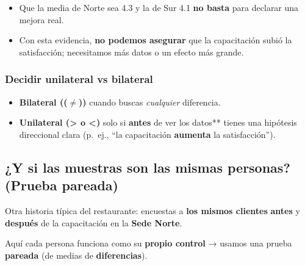 \documentclass[
  spanish,
  letterpaper,
  DIV=11,
  numbers=noendperiod]{scrreprt}
\providecommand{\tightlist}{%
  \setlength{\itemsep}{0pt}\setlength{\parskip}{0pt}}
\begin{document}
\begin{tcolorbox}[enhanced jigsaw, toptitle=1mm, opacitybacktitle=0.6, leftrule=.75mm, arc=.35mm, title=\textcolor{quarto-callout-tip-color}{\faLightbulb}\hspace{0.5em}{Lectura práctica}, colback=white, bottomrule=.15mm, colbacktitle=quarto-callout-tip-color!10!white, opacityback=0, bottomtitle=1mm, breakable, rightrule=.15mm, coltitle=black, left=2mm, titlerule=0mm, colframe=quarto-callout-tip-color-frame, toprule=.15mm]

\begin{itemize}
\tightlist
\item
  Que la media de Norte sea 4.3 y la de Sur 4.1 \textbf{no basta} para
  declarar una mejora real.
\item
  Con esta evidencia, \textbf{no podemos asegurar} que la capacitación
  subió la satisfacción; necesitamos más datos o un efecto más grande.
\end{itemize}

\end{tcolorbox}

\subsubsection{Decidir unilateral vs
bilateral}\label{decidir-unilateral-vs-bilateral}

\begin{itemize}
\tightlist
\item
  \textbf{Bilateral ((\(\neq\)))} cuando buscas \emph{cualquier}
  diferencia.\\
\item
  \textbf{Unilateral (\textgreater{} o \textless)} solo si
  \textbf{antes} de ver los datos** tienes una hipótesis direccional
  clara (p.~ej., ``la capacitación \textbf{aumenta} la satisfacción'').
\end{itemize}

\subsection{¿Y si las muestras son las mismas personas? (Prueba
pareada)}\label{y-si-las-muestras-son-las-mismas-personas-prueba-pareada}

Otra historia típica del restaurante: encuestas a \textbf{los mismos
clientes} \textbf{antes} y \textbf{después} de la capacitación en la
\textbf{Sede Norte}.

Aquí cada persona funciona como su \textbf{propio control} → usamos una
prueba \textbf{pareada} (de medias de \textbf{diferencias}).
\end{document}
